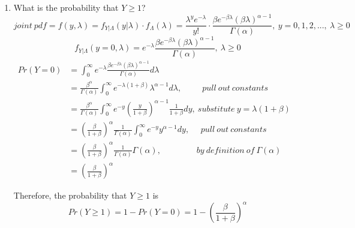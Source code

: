 \documentclass[11pt]{article}
\begin{document}
\begin{enumerate}[label=\textbf{Question \arabic*:},start=1]
\begin{enumerate}
	\item What is the probability that $Y\geq 1$?
	\[
	joint\ pdf = f(y,\lambda) = f_{Y|\Lambda}(y|\lambda) \cdot f_{\Lambda}(\lambda) = \frac{\lambda^y e^{-\lambda}}{y!} \cdot \frac{\beta e^{-\beta \lambda} (\beta \lambda)^{\alpha-1}}{\Gamma(\alpha)},\ y = 0, 1, 2, ...,\ \lambda \geq 0
	\]
	\[
	 f_{Y|\Lambda}(y=0, \lambda) = e^{-\lambda} \frac{\beta e^{-\beta \lambda} (\beta \lambda)^{\alpha-1}}{\Gamma(\alpha)},\ \lambda \geq 0
	 \]
	\begin{align*}
	Pr(Y=0) & = \int_0^{\infty} e^{-\lambda} \frac{\beta e^{-\beta \lambda} (\beta \lambda)^{\alpha-1}}{\Gamma(\alpha)} d\lambda \\
	& = \frac{\beta^\alpha}{\Gamma(\alpha)} \int_0^{\infty} e^{-\lambda(1+\beta)} \lambda^{\alpha-1} d \lambda,\ \ \ \ \ \ \ \ \ \ \ pull\ out\ constants \\
	& = \frac{\beta^\alpha}{\Gamma(\alpha)} \int_0^{\infty} e^{-y} (\frac{y}{1+\beta})^{\alpha-1} \frac{1}{1+\beta} dy,\  substitute\ y=\lambda(1+\beta) \\
	& = (\frac{\beta}{1+\beta})^\alpha \frac{1}{\Gamma(\alpha)} \int_0^{\infty} e^{-y} y^{\alpha-1} dy, \ \ \ \ \  \ pull\ out\ constants &\\
	& = (\frac{\beta}{1+\beta})^\alpha \frac{1}{\Gamma(\alpha)} \Gamma(\alpha),\ \ \ \ \ \ \ \ \ \ \ \ \ \ \ \ \ \ \ by\ definition\ of\ \Gamma(\alpha) \\
	& = (\frac{\beta}{1+\beta})^\alpha
	\end{align*}
	
	Therefore, the probability that $Y \geq 1$ is
	\[
	Pr(Y \geq 1) = 1 - Pr(Y=0) = 1 - (\frac{\beta}{1+\beta})^\alpha
	\]

\end{enumerate}







\end{enumerate}
\end{document}
